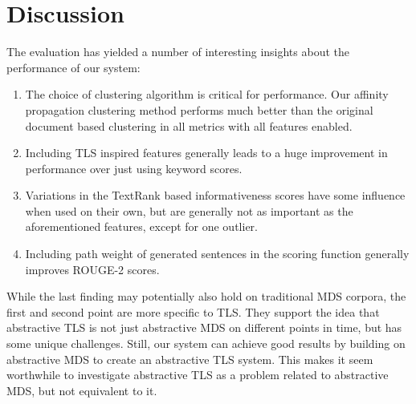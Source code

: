 \documentclass[a4paper,BCOR=10mm]{report}
\numberwithin{lemma}{chapter}
\numberwithin{definition}{chapter}
\begin{document}
%

\section{Discussion}

The evaluation has yielded a number of interesting insights about the performance of our system:

\begin{enumerate}
    \item{The choice of clustering algorithm is critical for performance. Our affinity propagation clustering method performs much better than the original document based clustering in all metrics with all features enabled.}
    \item{Including TLS inspired features generally leads to a huge improvement in performance over just using keyword scores.}
    \item{Variations in the TextRank based informativeness scores have some influence when used on their own, but are generally not as important as the aforementioned features, except for one outlier.}
    \item{Including path weight of generated sentences in the scoring function generally improves ROUGE-2 scores.}
\end{enumerate}

While the last finding may potentially also hold on traditional MDS corpora, the first and second point are more specific to TLS.
They support the idea that abstractive TLS is not just abstractive MDS on different points in time, but has some unique challenges.
Still, our system can achieve good results by building on abstractive MDS to create an abstractive TLS system.
This makes it seem worthwhile to investigate abstractive TLS as a problem related to abstractive MDS, but not equivalent to it.
\end{document}
